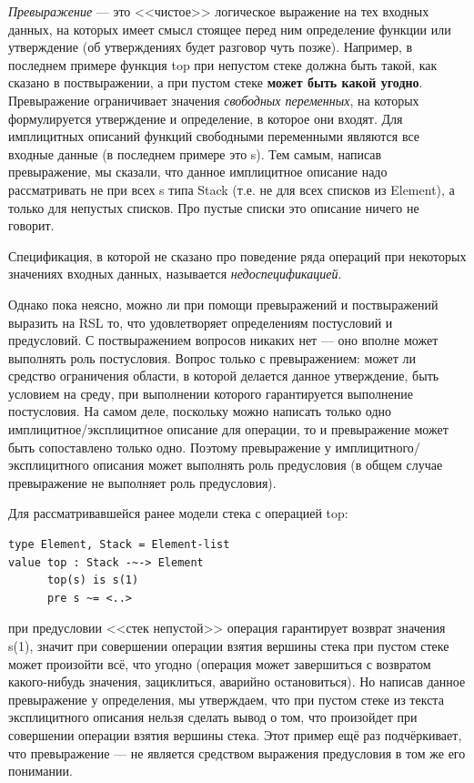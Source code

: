 \documentclass[14pt, twoside]{extreport}
\begin{document}
\emph{Превыражение} --- это <<чистое>> логическое выражение на тех входных данных, на которых имеет смысл стоящее перед ним определение функции или утверждение (об утверждениях будет разговор чуть позже). Например, в последнем примере функция top при непустом стеке должна быть такой, как сказано в поствыражении, а при пустом стеке \textbf{может быть какой угодно}. Превыражение ограничивает значения \emph{свободных переменных}, на которых формулируется утверждение и определение, в которое они входят. Для имплицитных описаний функций свободными переменными являются все входные данные (в последнем примере это s). Тем самым, написав превыражение, мы сказали, что данное имплицитное описание надо рассматривать не при всех s типа Stack (т.е. не для всех списков из Element), а только для непустых списков. Про пустые списки это описание ничего не говорит. 

Спецификация, в которой не сказано про поведение ряда операций при некоторых значениях входных данных, называется \emph{недоспецификацией}.

Однако пока неясно, можно ли при помощи превыражений и поствыражений выразить на RSL то, что удовлетворяет определениям постусловий и предусловий. С поствыражением вопросов никаких нет --- оно вполне может выполнять роль постусловия. Вопрос только с превыражением: может ли средство ограничения области, в которой делается данное утверждение, быть условием на среду, при выполнении которого гарантируется выполнение постусловия. На самом деле, поскольку можно написать только одно имплицитное/эксплицитное описание для операции, то и превыражение может быть сопоставлено только одно. Поэтому превыражение у имплицитного/эксплицитного описания может выполнять роль предусловия (в общем случае превыражение не выполняет роль предусловия).

Для рассматривавшейся ранее модели стека с операцией top:
\begin{lstlisting}
type Element, Stack = Element-list
value top : Stack -~-> Element
      top(s) is s(1)
      pre s ~= <..>
\end{lstlisting}
при предусловии <<стек непустой>> операция гарантирует возврат значения s(1), значит при совершении операции взятия вершины стека при пустом стеке может произойти всё, что угодно (операция может завершиться с возвратом какого-нибудь значения, зациклиться, аварийно остановиться). Но написав данное превыражение у определения, мы утверждаем, что при пустом стеке из текста эксплицитного описания нельзя сделать вывод о том, что произойдет при совершении операции взятия вершины стека. Этот пример ещё раз подчёркивает, что превыражение --- не является средством выражения предусловия в том же его понимании.
\end{document}
